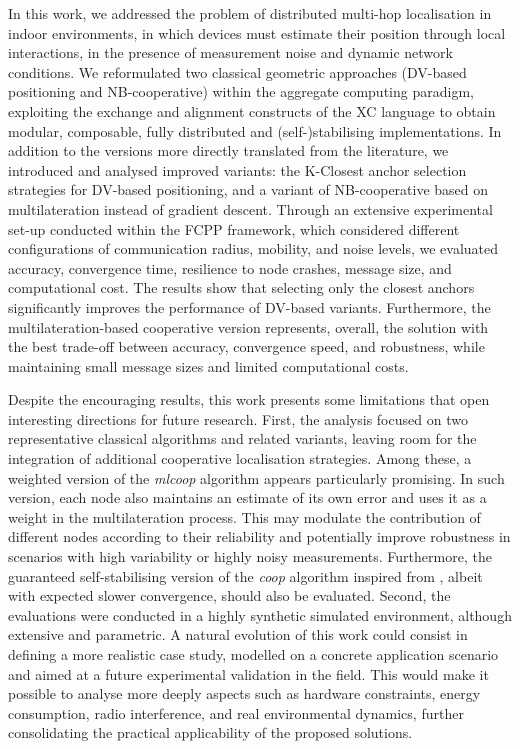 \documentclass[runningheads]{llncs}
\begin{document}
In this work, we addressed the problem of distributed multi-hop localisation in indoor environments, in which devices must estimate their position through local interactions, in the presence of measurement noise and dynamic network conditions. We reformulated two classical geometric approaches (DV-based positioning and NB-cooperative) within the aggregate computing paradigm, exploiting the exchange and alignment constructs of the XC language to obtain modular, composable, fully distributed and (self-)stabilising implementations. In addition to the versions more directly translated from the literature, we introduced and analysed improved variants: the K-Closest anchor selection strategies for DV-based positioning, and a variant of NB-cooperative based on multilateration instead of gradient descent. Through an extensive experimental set-up conducted within the FCPP framework, which considered different configurations of communication radius, mobility, and noise levels, we evaluated accuracy, convergence time, resilience to node crashes, message size, and computational cost. The results show that selecting only the closest anchors significantly improves the performance of DV-based variants. Furthermore, the multilateration-based cooperative version represents, overall, the solution with the best trade-off between accuracy, convergence speed, and robustness, while maintaining small message sizes and limited computational costs.

Despite the encouraging results, this work presents some limitations that open interesting directions for future research. First, the analysis focused on two representative classical algorithms and related variants, leaving room for the integration of additional cooperative localisation strategies. Among these, a weighted version of the \emph{mlcoop} algorithm appears particularly promising. In such version, each node also maintains an estimate of its own error and uses it as a weight in the multilateration process. This may modulate the contribution of different nodes according to their reliability and potentially improve robustness in scenarios with high variability or highly noisy measurements. Furthermore, the guaranteed self-stabilising version of the \emph{coop} algorithm inspired from \cite{11205997}, albeit with expected slower convergence, should also be evaluated.
Second, the evaluations were conducted in a highly synthetic simulated environment, although extensive and parametric. A natural evolution of this work could consist in defining a more realistic case study, modelled on a concrete application scenario and aimed at a future experimental validation in the field. This would make it possible to analyse more deeply aspects such as hardware constraints, energy consumption, radio interference, and real environmental dynamics, further consolidating the practical applicability of the proposed solutions.
\end{document}
